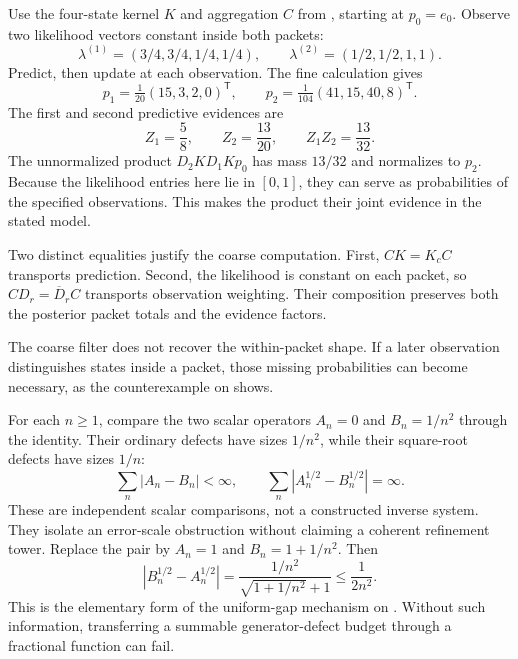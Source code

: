 Use the four-state kernel $K$ and aggregation $C$ from , starting at $p_0=e_0$. Observe two likelihood vectors constant inside both packets:
\[
\lambda^{(1)}=(3/4,3/4,1/4,1/4),\qquad
\lambda^{(2)}=(1/2,1/2,1,1).
\]
Predict, then update at each observation. The fine calculation gives
\[
p_1=\tfrac1{20}(15,3,2,0)^{\mathsf T},\qquad
p_2=\tfrac1{104}(41,15,40,8)^{\mathsf T}.
\]
The first and second predictive evidences are
\[
Z_1=\frac58,\qquad Z_2=\frac{13}{20},
\qquad Z_1Z_2=\frac{13}{32}.
\]
The unnormalized product $D_2KD_1Kp_0$ has mass $13/32$ and normalizes to $p_2$. Because the likelihood entries here lie in $[0,1]$, they can serve as probabilities of the specified observations. This makes the product their joint evidence in the stated model.

Two distinct equalities justify the coarse computation. First, $CK=K_cC$ transports prediction. Second, the likelihood is constant on each packet, so $CD_r=\overline D_rC$ transports observation weighting. Their composition preserves both the posterior packet totals and the evidence factors.

The coarse filter does not recover the within-packet shape. If a later observation distinguishes states inside a packet, those missing probabilities can become necessary, as the counterexample on  shows.

For each $n\ge1$, compare the two scalar operators $A_n=0$ and $B_n=1/n^2$ through the identity. Their ordinary defects have sizes $1/n^2$, while their square-root defects have sizes $1/n$:
\[
\sum_n|A_n-B_n|<\infty,
\qquad
\sum_n|A_n^{1/2}-B_n^{1/2}|=\infty.
\]
These are independent scalar comparisons, not a constructed inverse system. They isolate an error-scale obstruction without claiming a coherent refinement tower.
Replace the pair by $A_n=1$ and $B_n=1+1/n^2$. Then
\[
\left|B_n^{1/2}-A_n^{1/2}\right|
=\frac{1/n^2}{\sqrt{1+1/n^2}+1}
\le\frac1{2n^2}.
\]
This is the elementary form of the uniform-gap mechanism on . Without such information, transferring a summable generator-defect budget through a fractional function can fail.

